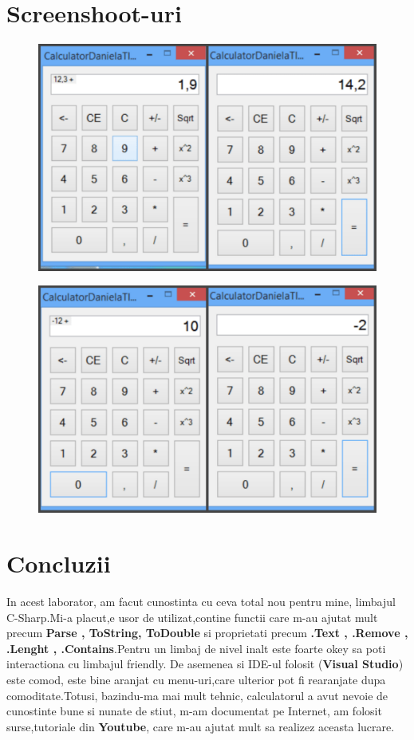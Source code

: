 \section{Screenshoot-uri}
\begin{figure}[h]
\centering
\includegraphics[scale=1]{image.pdf}
\end{figure}

\begin{figure}[h]
\centering
\includegraphics[scale=1]{colaj2.pdf}
\end{figure}

\clearpage
\section{Concluzii}

\tab In acest laborator, am facut cunostinta cu ceva total nou pentru mine, limbajul C-Sharp.Mi-a placut,e usor de utilizat,contine functii care m-au ajutat mult precum \textbf{Parse , ToString, ToDouble} si proprietati precum \textbf{.Text , .Remove , .Lenght , .Contains}.Pentru un limbaj de nivel inalt este foarte okey sa poti interactiona cu limbajul friendly. De asemenea si IDE-ul folosit (\textbf{Visual Studio}) este comod, este bine aranjat cu menu-uri,care ulterior pot fi rearanjate dupa comoditate.Totusi, bazindu-ma mai mult tehnic, calculatorul a avut nevoie de cunostinte bune si nunate de stiut, m-am documentat pe Internet, am folosit surse,tutoriale din \textbf{Youtube}, care m-au ajutat mult sa realizez aceasta lucrare.
\clearpage